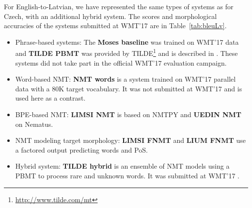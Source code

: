\documentclass[11pt,letterpaper,final,nohyperref]{article}
\begin{document}
For English-to-Latvian, we have represented
the same types of systems as for Czech, with an additional hybrid
system. The scores and morphological accuracies of the systems submitted at WMT'17 are in Table~\ref{tab:bleuLv}.

\begin{itemize}
  \item Phrase-based systems: The \textbf{Moses baseline} was trained on
    WMT'17 data and \textbf{TILDE PBMT}
    was provided by TILDE\footnote{\url{http://www.tilde.com/mt}} and is described in \cite{peter17qt21}.
    These systems did not take part in the official WMT'17 evaluation campaign.
  \item Word-based NMT: \textbf{NMT words} is a system trained on
    WMT'17 parallel data with a 80K target vocabulary. It
    was not submitted at WMT'17 and is used here as a contrast.
  \item BPE-based NMT: \textbf{LIMSI NMT} \cite{burlot16wmt} is based on NMTPY and
    \textbf{UEDIN NMT} \cite{uedin2017wmt} on Nematus.
  \item NMT modeling target morphology: \textbf{LIMSI FNMT} \cite{burlot16wmt} and
    \textbf{LIUM FNMT} \cite{garcia2017wmtnews} use a factored output predicting words and PoS.
  \item Hybrid system: \textbf{TILDE hybrid} is an ensemble of NMT models
    using a PBMT to process rare and unknown words. It was
    submitted at WMT'17 \cite{Pinnis2017}.
\end{itemize}
\end{document}
